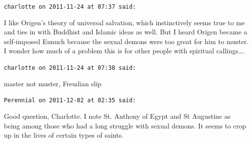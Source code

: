 \begin{footnotesize}\begin{sffamily}



\texttt{charlotte on 2011-11-24 at 07:37 said: }

I like Origen's theory of universal salvation, which instinctively seems true to me and ties in with Buddhist and Islamic ideas as well. But I heard Origen became a self-imposed Eunuch because the sexual demons were too great for him to muster. I wonder how much of a problem this is for other people with spiritual callings….

\hfill

\texttt{charlotte on 2011-11-24 at 07:38 said: }

master not muster, Freudian slip


\hfill

\texttt{Perennial on 2011-12-02 at 02:35 said: }

Good question, Charlotte. I note St. Anthony of Egypt and St Augustine as being among those who had a long struggle with sexual demons. It seems to crop up in the lives of certain types of saints.


\end{sffamily}\end{footnotesize}
